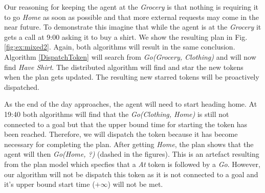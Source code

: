 Our reasoning for keeping the agent at the {\em Grocery} is that
nothing is requiring it to go {\em Home} as soon as possible and that
more external requests may come in the near future. To demonstrate
this imagine that while the agent is at the {\em Grocery} it gets a
call at 9:00 asking it to buy a shirt.  We show the resulting plan in
Fig. \ref{fig:ex:mixed2}. Again, both algorithms will result in the
same conclusion. Algorithm \ref{DispatchToken} will search from {\em
Go(Grocery, Clothing)} and will now find {\em Have Shirt}. The
distributed algorithm will find and star the new tokens when the plan
gets updated. The resulting new starred tokens will be proactively
dispatched.

As the end of the day approaches, the agent will need to start heading
home. At 19:40 both algorithms will find that the {\em Go(Clothing,
Home)} is still not connected to a goal but that the upper bound time
for starting the token has been reached. Therefore, we will dispatch
the token because it has become necessary for completing the plan.
After getting {\em Home}, the plan shows that the agent will then {\em
Go(Home, ?)} (dashed in the figures). This is an artefact resulting
from the plan model which specfies that a {\em At} token is followed by a {\em Go}. 
However, our algorithm will not be dispatch this token as 
it is not connected to a goal and it's upper bound start time
($+\infty$) will not be met.



